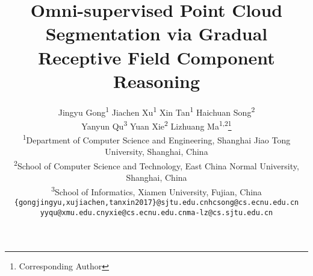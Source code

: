 \documentclass[final]{cvpr}
\begin{document}
\title{Omni-supervised Point Cloud Segmentation via Gradual Receptive Field Component Reasoning}

\iffalse
\author{First Author\\
Institution1\\
Institution1 address\\
{\tt\small firstauthor@i1.org}
\and
Second Author\\
Institution2\\
First line of institution2 address\\
{\tt\small secondauthor@i2.org}
}
\fi
\author{
Jingyu Gong\textsuperscript{\rm 1}\;\quad
Jiachen Xu\textsuperscript{\rm 1}\;\quad
Xin Tan\textsuperscript{\rm 1}\;\quad
Haichuan Song\textsuperscript{\rm 2}\;\quad\\
Yanyun Qu\textsuperscript{\rm 3}\;\quad
Yuan Xie\textsuperscript{\rm 2}\;\quad
Lizhuang Ma\textsuperscript{\rm 1,2}\thanks{Corresponding Author}\\
\textsuperscript{\rm 1}Department of Computer Science and Engineering, Shanghai Jiao Tong University, Shanghai, China\\
\textsuperscript{\rm 2}School of Computer Science and Technology, East China Normal University, Shanghai, China\\
\textsuperscript{\rm 3}School of Informatics, Xiamen University, Fujian, China\\
{\tt\small \{gongjingyu,xujiachen,tanxin2017\}@sjtu.edu.cn\;\quad  hcsong@cs.ecnu.edu.cn}\\
{\tt\small yyqu@xmu.edu.cn\;\quad yxie@cs.ecnu.edu.cn\;\quad ma-lz@cs.sjtu.edu.cn}
}

\maketitle
\end{document}

